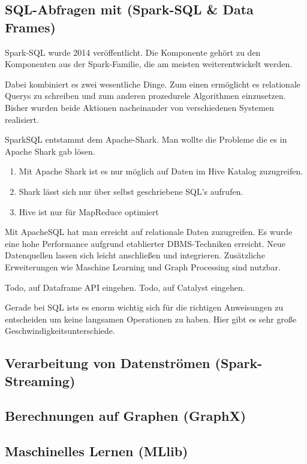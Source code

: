 \newpage
\subsection{SQL-Abfragen mit (Spark-SQL \& Data Frames)}

Spark-SQL wurde 2014 veröffentlicht. Die Komponente gehört zu den Komponenten aus der Spark-Familie, die am meisten weiterentwickelt werden. 


Dabei kombiniert es zwei wesentliche Dinge. Zum einen ermöglicht es relationale Querys zu schreiben und zum anderen prozedurele Algorithmen einzusetzen. Bisher wurden beide Aktionen nacheinander von verschiedenen Systemen realisiert. 

SparkSQL entstammt dem Apache-Shark. Man wollte die Probleme die es in Apache Shark gab lösen.
\begin{enumerate}
	\item Mit Apache Shark ist es nur möglich auf Daten im Hive Katalog zuzugreifen. 
	\item Shark lässt sich nur über selbst geschriebene SQL's aufrufen. 
	\item Hive ist nur für MapReduce optimiert
\end{enumerate}

Mit ApacheSQL hat man erreicht auf relationale Daten zuzugreifen. Es wurde eine hohe Performance aufgrund etablierter DBMS-Techniken erreicht.
Neue Datenquellen lassen sich leicht anschließen und integrieren.
Zusätzliche Erweiterungen wie Maschine Learning und Graph Processing sind nutzbar.

Todo, auf Dataframe API eingehen.
Todo, auf Catalyst eingehen.


Gerade bei SQL ists es enorm wichtig sich für die richtigen Anweisungen zu entscheiden um keine langsamen Operationen zu haben. 
Hier gibt es sehr große Geschwindigkeitsunterschiede.

\newpage
\subsection{Verarbeitung von Datenströmen (Spark-Streaming)}

\subsection{Berechnungen auf Graphen (GraphX)}

\subsection{Maschinelles Lernen (MLlib)}

